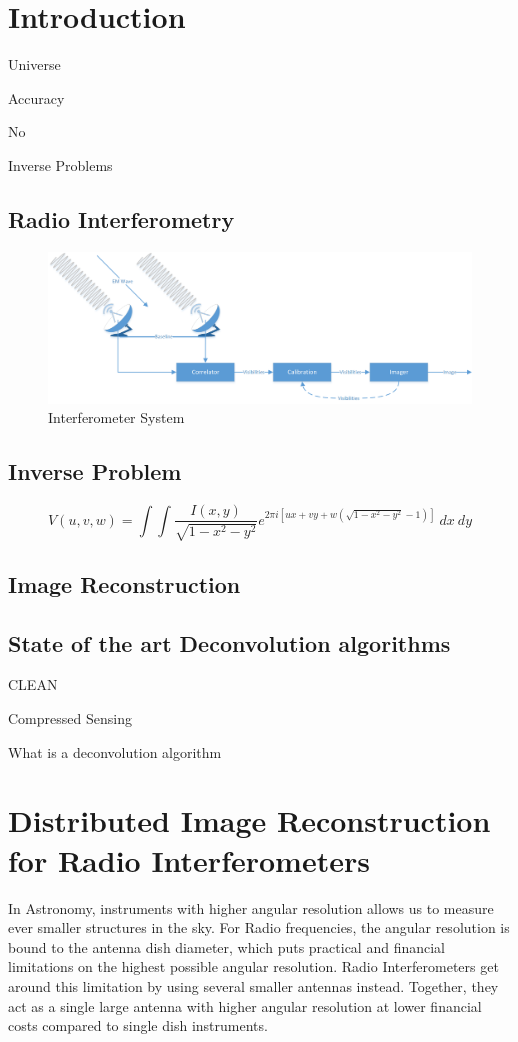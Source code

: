 \section{Introduction}\label{intro}
Universe

Accuracy

No 

Inverse Problems

\subsection{Radio Interferometry}
\begin{figure}[h]
	\centering
	\includegraphics[width=0.80\linewidth]{./chapters/01.intro/system.png}
	\caption{Interferometer System}
	\label{intro:system}
\end{figure}

\subsection{Inverse Problem}




\begin{equation}\label{intro:ftsphere}
V(u, v, w) = \int\int \frac{I(x, y)}{\sqrt{1 - x^2 - y ^2}} e^{2 \pi i [ux+vy+ w(\sqrt{1 - x^2 - y ^2} - 1)]} \: dx \: dy
\end{equation}



\subsection{Image Reconstruction}

\subsection{State of the art Deconvolution algorithms}

CLEAN

Compressed Sensing

What is a deconvolution algorithm

\pagebreak
\section{Distributed Image Reconstruction for Radio Interferometers}
In Astronomy, instruments with higher angular resolution allows us to measure ever smaller structures in the sky. For Radio frequencies, the angular resolution is bound to the antenna dish diameter, which puts practical and financial limitations on the highest possible angular resolution. Radio Interferometers get around this limitation by using several smaller antennas instead. Together, they act as a single large antenna with higher angular resolution at lower financial costs compared to single dish instruments.

